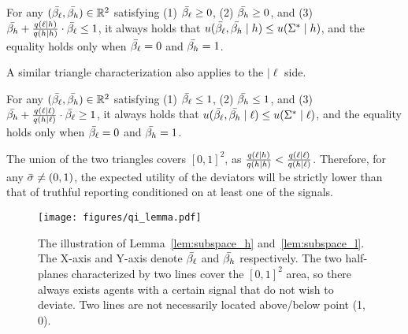 \begin{lemma}
\label{lem:subspace_h}
    For any $(\bar{\beta_{\ell}}, \bar{\beta_{h}}) \in \mathbb{R}^2$ satisfying (1) $\bar{\beta_{\ell}} \ge 0$, (2) $\bar{\beta_{h}} \ge 0$, and (3) $\bar{\beta_{h}} + \frac{q(\ell \mid h)}{q (h \mid h)}\cdot \bar{\beta_{\ell}} \le 1$, it always holds that $ u(\bar{\beta_{\ell}}, \bar{\beta_{h}} \mid h) \le u(\Sigma^* \mid h)$, and the equality holds only when $\bar{\beta_{\ell}} = 0$ and $\bar{\beta_{h}} = 1$. 
\end{lemma}
A similar triangle characterization also applies to the $|\ell$ side. 
\begin{lemma}
\label{lem:subspace_l}
    For any $(\bar{\beta_{\ell}}, \bar{\beta_{h}}) \in \mathbb{R}^2$ satisfying (1) $\bar{\beta_{\ell}} \le 1$, (2) $\bar{\beta_{h}} \le 1$, and (3) $\bar{\beta_{h}} + \frac{q(\ell \mid \ell)}{q (h \mid \ell)}\cdot \bar{\beta_{\ell}} \ge 1$, it always holds that $ u(\bar{\beta_{\ell}}, \bar{\beta_{h}} \mid \ell) \le u(\Sigma^*\mid \ell )$, and the equality holds only when $\bar{\beta_{\ell}} = 0$ and $\bar{\beta_{h}} = 1$. 
\end{lemma}

The union of the two triangles covers $[0, 1]^2$, as $\frac{q(\ell \mid h)}{q(h \mid h)} < \frac{q(\ell \mid \ell)}{q(h \mid \ell)}$. Therefore, for any $\bar{\sigma} \neq (0, 1)$, the \qi{} expected utility of the deviators will be strictly lower than that of truthful reporting conditioned on at least one of the signals. 

\begin{figure}[htbp]
    \centering
    \texttt{[image: figures/qi\_lemma.pdf]}
    \caption{The illustration of Lemma~\ref{lem:subspace_h} and~\ref{lem:subspace_l}. The X-axis and Y-axis denote $\bar{\beta_{\ell}}$ and $\bar{\beta_{h}}$ respectively. The two half-planes characterized by two lines cover the $[0,1]^2$ area, so there always exists agents with a certain signal that do not wish to deviate. Two lines are not necessarily located above/below point (1, 0). }
    \label{fig:qi_lemma}
\end{figure}

